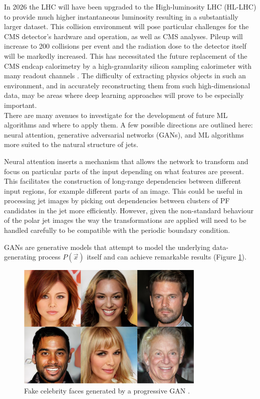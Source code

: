 In 2026 the LHC will have been upgraded to the High-luminosity LHC (HL-LHC) \cite{HLLHC} to provide much higher instantaneous luminosity resulting in a substantially larger dataset. 
This collision environment will pose particular challenges for the CMS detector's hardware and operation, as well as CMS analyses.  
Pileup will increase to 200 collisions per event and the radiation dose to the detector itself will be markedly increased. This has necessitated the future replacement of the CMS endcap calorimetry by a high-granularity silicon sampling calorimeter with many readout channels \cite{HGC}. 
The difficulty of extracting physics objects in such an environment, and in accurately reconstructing them from such high-dimensional data, may be areas where deep learning approaches will prove to be especially important. \\


There are many avenues to investigate for the development of future ML algorithms and where to apply them. 
A few possible directions are outlined here: neural attention, generative adversarial networks (GANs), and ML algorithms more suited to the natural structure of jets.

Neural attention \cite{Attention,SpatialTransformer} inserts a mechanism that allows the network to transform and focus on particular parts of the input depending on what features are present. 
This facilitates the construction of long-range dependencies between different input regions, for example different parts of an image.
This could be useful in processing jet images by picking out dependencies between clusters of PF candidates in the jet more efficiently.
However, given the non-standard behaviour of the polar jet images the way the transformations are applied will need to be handled carefully to be compatible with the periodic boundary condition.

GANs \cite{GANs} are generative models that attempt to model the underlying data-generating process $P(\vec{x})$ itself and can achieve remarkable results (Figure \ref{fig:conclusion:progan}).
\begin{figure}[h!]
    \begin{center}
        \includegraphics[width=0.8\textwidth]{figures/conclusion/progan.png}
    \end{center}
    \caption{Fake celebrity faces generated by a progressive GAN \cite{ProGAN}.}
        \label{fig:conclusion:progan}
\end{figure}

